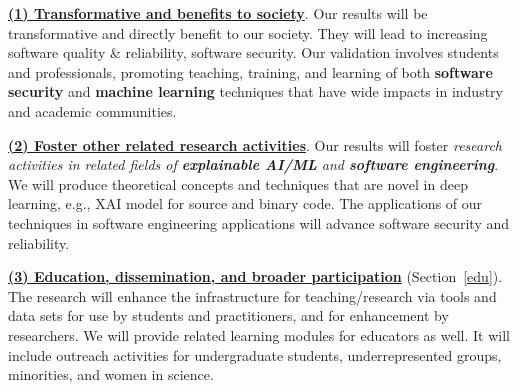 \underline{{\bf (1) Transformative and benefits to society}}. Our
results will be transformative and directly benefit to our society.
They will lead to increasing software quality \& reliability, software
security.  Our validation involves students and professionals,
promoting teaching, training, and learning of both {\bf software
  security} and {\bf machine learning} techniques that have wide
impacts in industry and academic communities.

\noindent\underline{{\bf (2) Foster other related research
    activities}}. Our results will foster {\em research activities in
  related fields of {\bf explainable AI/ML} and {\bf software
    engineering}}. We will produce theoretical concepts and techniques
that are novel in deep learning, e.g., XAI model for source and binary
code. The applications of our techniques in software engineering
applications will advance software security and reliability.



\noindent\underline{{\bf (3) Education, dissemination, and broader participation}} (Section~\ref{edu}). The
research will enhance the infrastructure for teaching/research via
tools and data sets for use by students and practitioners, and for
enhancement by researchers. We will provide related learning
modules for educators as well. It will include outreach activities for
undergraduate students, underrepresented groups, minorities, and women
in science.



